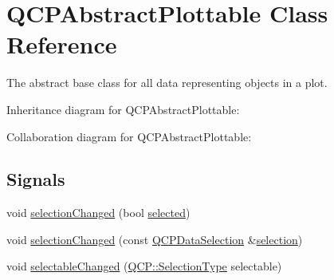 \hypertarget{classQCPAbstractPlottable}{}\section{Q\+C\+P\+Abstract\+Plottable Class Reference}
\label{classQCPAbstractPlottable}


The abstract base class for all data representing objects in a plot.  




Inheritance diagram for Q\+C\+P\+Abstract\+Plottable\+:


Collaboration diagram for Q\+C\+P\+Abstract\+Plottable\+:
\subsection*{Signals}
\begin{DoxyCompactItemize}
\item 
void \hyperlink{classQCPAbstractPlottable_a3af66432b1dca93b28e00e78a8c7c1d9}{selection\+Changed} (bool \hyperlink{classQCPAbstractPlottable_ab901903adcb0e29467d63de72340ab29}{selected})
\item 
void \hyperlink{classQCPAbstractPlottable_a787a9c39421059006891744b731fa473}{selection\+Changed} (const \hyperlink{classQCPDataSelection}{Q\+C\+P\+Data\+Selection} \&\hyperlink{classQCPAbstractPlottable_a6fcea502826afbaab2568bd3ebc61b4b}{selection})
\item 
void \hyperlink{classQCPAbstractPlottable_a663b1a44123c8340ac041a29d1e2c973}{selectable\+Changed} (\hyperlink{namespaceQCP_ac6cb9db26a564b27feda362a438db038}{Q\+C\+P\+::\+Selection\+Type} selectable)
\end{DoxyCompactItemize}
